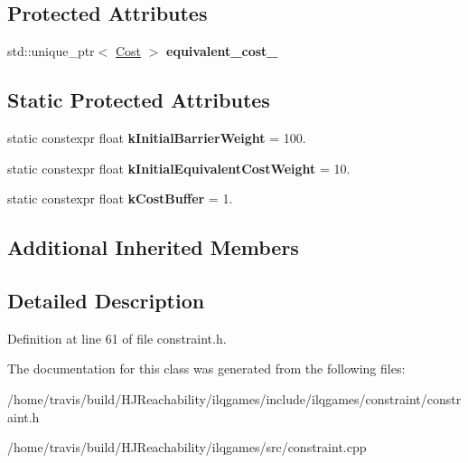 \subsection*{Protected Attributes}
\begin{DoxyCompactItemize}
\item 
std\+::unique\+\_\+ptr$<$ \hyperlink{classilqgames_1_1_cost}{Cost} $>$ {\bfseries equivalent\+\_\+cost\+\_\+}\hypertarget{classilqgames_1_1_constraint_aa33d6b05a13fe556b844656f07753e37}{}\label{classilqgames_1_1_constraint_aa33d6b05a13fe556b844656f07753e37}

\end{DoxyCompactItemize}
\subsection*{Static Protected Attributes}
\begin{DoxyCompactItemize}
\item 
static constexpr float {\bfseries k\+Initial\+Barrier\+Weight} = 100.\hypertarget{classilqgames_1_1_constraint_a1c1566fc2fa74e58b54fae57c07b7af8}{}\label{classilqgames_1_1_constraint_a1c1566fc2fa74e58b54fae57c07b7af8}

\item 
static constexpr float {\bfseries k\+Initial\+Equivalent\+Cost\+Weight} = 10.\hypertarget{classilqgames_1_1_constraint_a64fd12449a7f42d19c68b568140699a3}{}\label{classilqgames_1_1_constraint_a64fd12449a7f42d19c68b568140699a3}

\item 
static constexpr float {\bfseries k\+Cost\+Buffer} = 1.\hypertarget{classilqgames_1_1_constraint_aaef1da643690381eca61569190863129}{}\label{classilqgames_1_1_constraint_aaef1da643690381eca61569190863129}

\end{DoxyCompactItemize}
\subsection*{Additional Inherited Members}


\subsection{Detailed Description}


Definition at line 61 of file constraint.\+h.



The documentation for this class was generated from the following files\+:\begin{DoxyCompactItemize}
\item 
/home/travis/build/\+H\+J\+Reachability/ilqgames/include/ilqgames/constraint/constraint.\+h\item 
/home/travis/build/\+H\+J\+Reachability/ilqgames/src/constraint.\+cpp\end{DoxyCompactItemize}
